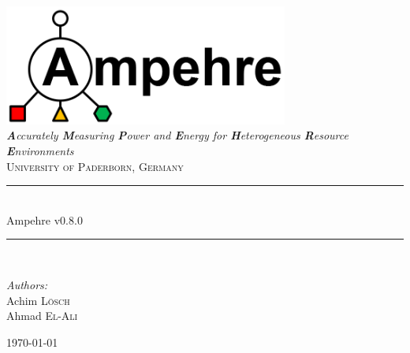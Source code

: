 %
%
%
%
%
%

\begin{titlepage}

\begin{center}

\includegraphics[width=0.7\textwidth]{figures/ampehre_logo.png}\\[1cm]

\textit{\LARGE \textbf{A}ccurately \textbf{M}easuring \textbf{P}ower and \textbf{E}nergy for \textbf{H}eterogeneous \textbf{R}esource \textbf{E}nvironments}\\[1cm]

\textsc{\Large University of Paderborn, Germany}\\[1cm]

\newcommand{\HRule}{\rule{\linewidth}{0.5mm}} \HRule \\[0.6cm] { \huge Ampehre v0.8.0}\\[0.4cm]

\HRule\\[1cm]

\begin{minipage}{0.4\textwidth} \begin{center} \large \emph{Authors:}\\ Achim \textsc{L\"osch}\\Ahmad \textsc{El-Ali} \end{center} \end{minipage}

\vfill

{\Large \today}

\end{center}

\end{titlepage}

\tableofcontents
